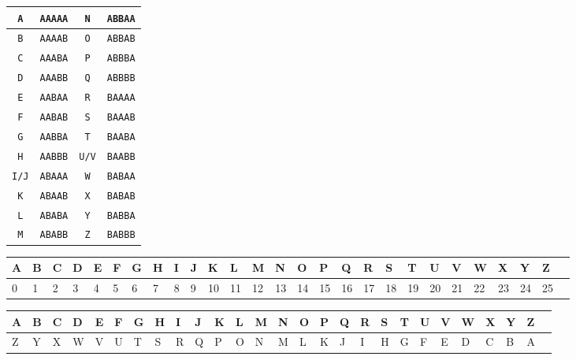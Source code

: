 \documentclass{article}
\numberwithin{figure}{section}
\numberwithin{equation}{section}
\begin{document}
{\large
\begin{flushright}
\begin{tabular}{|c|c|c|c|}
\hline
\verb|A| & \verb|AAAAA| & \verb|N| & \verb|ABBAA| \\ \hline
\verb|B| & \verb|AAAAB| & \verb|O| & \verb|ABBAB| \\ \hline
\verb|C| & \verb|AAABA| & \verb|P| & \verb|ABBBA| \\ \hline
\verb|D| & \verb|AAABB| & \verb|Q| & \verb|ABBBB| \\ \hline
\verb|E| & \verb|AABAA| & \verb|R| & \verb|BAAAA| \\ \hline
\verb|F| & \verb|AABAB| & \verb|S| & \verb|BAAAB| \\ \hline
\verb|G| & \verb|AABBA| & \verb|T| & \verb|BAABA| \\ \hline
\verb|H| & \verb|AABBB| & \verb|U/V| & \verb|BAABB| \\ \hline
\verb|I/J| & \verb|ABAAA| & \verb|W| & \verb|BABAA| \\ \hline
\verb|K| & \verb|ABAAB| & \verb|X| & \verb|BABAB| \\ \hline
\verb|L| & \verb|ABABA| & \verb|Y| & \verb|BABBA| \\ \hline
\verb|M| & \verb|ABABB| & \verb|Z| & \verb|BABBB| \\
\hline
\end{tabular}
\end{flushright}
}
\bigskip
\vspace{1.5cm}
\setlength{\tabcolsep}{3pt}

\begin{center}
\begin{tabular}{|m{9.675pt}|m{9.675pt}|m{9.675pt}|m{9.675pt}|m{9.675pt}|m{9.675pt}|m{9.675pt}|m{9.675pt}|m{9.675pt}|m{9.675pt}|m{9.675pt}|m{9.675pt}|m{9.675pt}|m{9.675pt}|m{9.675pt}|m{9.675pt}|m{9.675pt}|m{9.675pt}|m{9.675pt}|m{9.675pt}|m{9.675pt}|m{9.675pt}|m{9.675pt}|m{9.675pt}|m{9.675pt}|m{9.675pt}|m{9.675pt}|}
\hline
A &B &C &D &E &F &G &H &I &J &K &L &M &N &O &P &Q &R &S &T &U &V &W &X &Y &Z \\
\hline
0 &1 &2 &3 &4 &5 &6 &7 &8 &9 &10 &11 &12 &13 &14 &15 &16 &17 &18 &19 &20 &21 &22 &23 &24 &25 \\
\hline
\end{tabular}
\end{center}

\vspace{0.2cm}

\begin{center}
\begin{tabular}{|m{9.675pt}|m{9.675pt}|m{9.675pt}|m{9.675pt}|m{9.675pt}|m{9.675pt}|m{9.675pt}|m{9.675pt}|m{9.675pt}|m{9.675pt}|m{9.675pt}|m{9.675pt}|m{9.675pt}|m{9.675pt}|m{9.675pt}|m{9.675pt}|m{9.675pt}|m{9.675pt}|m{9.675pt}|m{9.675pt}|m{9.675pt}|m{9.675pt}|m{9.675pt}|m{9.675pt}|m{9.675pt}|m{9.675pt}|m{9.675pt}|}
\hline
A &B &C &D &E &F &G &H &I &J &K &L &M &N &O &P &Q &R &S &T &U &V &W &X &Y &Z \\
\hline
Z& Y& X& W& V& U& T& S& R& Q& P& O& N& M& L& K& J& I& H& G& F& E& D& C& B& A \\
\hline
\end{tabular}
\end{center}
\end{document}
